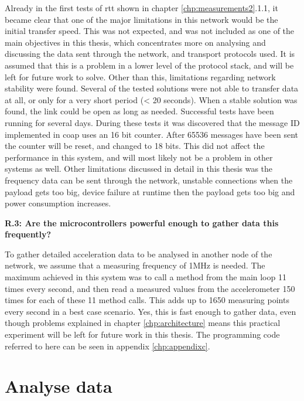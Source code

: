 \noindent Already in the first tests of \gls{rtt} shown in chapter \ref{chp:measurements2}.1.1, it became clear that one of the major limitations in this network would be the initial transfer speed. This was not expected, and was not included as one of the main objectives in this thesis, which concentrates more on analysing and discussing the data sent through the network, and transport protocols used. It is assumed that this is a problem in a lower level of the protocol stack, and will be left for future work to solve. Other than this, limitations regarding network stability were found. Several of the tested solutions were not able to transfer data at all, or only for a very short period (< 20 seconds). When a stable solution was found, the link could be open as long as needed. Successful tests have been running for several days. During these tests it was discovered that the message ID implemented in \gls{coap} uses an 16 bit counter. After 65536 messages have been sent the counter will be reset, and changed to 18 bits. This did not affect the performance in this system, and will most likely not be a problem in other systems as well. Other limitations discussed in detail in this thesis was the frequency data can be sent through the network, unstable connections when the \gls{payload} gets too big, device failure at runtime then the \gls{payload} gets too big and power consumption increases. 

\noindent\textbf{R.3: Are the microcontrollers powerful enough to gather data this frequently?}

\noindent To gather detailed acceleration data to be analysed in another node of the network, we assume that a measuring frequency of 1MHz is needed. The maximum achieved in this system was to call a method from the main loop 11 times every second, and then read a measured values from the accelerometer 150 times for each of these 11 method calls. This adds up to 1650 measuring points every second in a best case scenario. Yes, this is fast enough to gather data, even though problems explained in chapter \ref{chp:architecture} means this practical experiment will be left for future work in this thesis. The programming code referred to here can be seen in appendix \ref{chp:appendixc}. 


\section{Analyse data}

